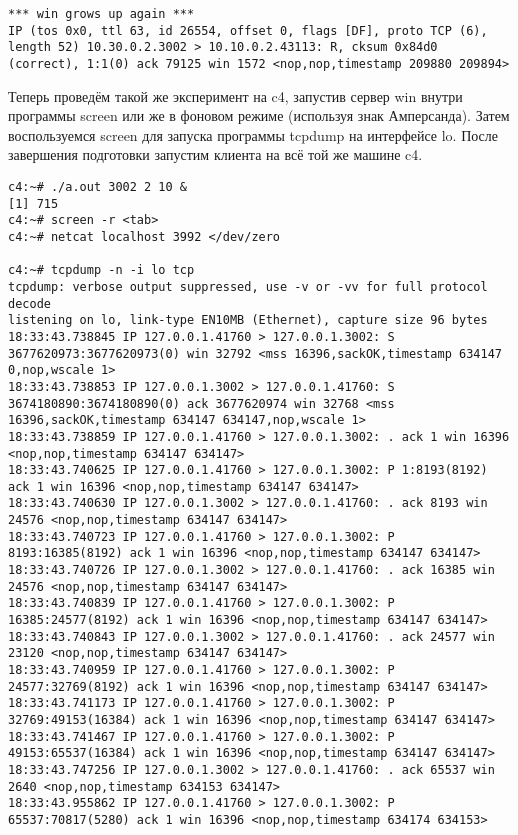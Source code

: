\documentclass[a4paper,12pt]{article}
\begin{document}
\begin{lstlisting}
*** win grows up again ***
IP (tos 0x0, ttl 63, id 26554, offset 0, flags [DF], proto TCP (6), length 52) 10.30.0.2.3002 > 10.10.0.2.43113: R, cksum 0x84d0 (correct), 1:1(0) ack 79125 win 1572 <nop,nop,timestamp 209880 209894>
\end{lstlisting}

Теперь проведём такой же эксперимент на c4, запустив сервер win внутри программы screen или же в фоновом режиме (используя знак Амперсанда). Затем воспользуемся screen для запуска программы tcpdump на интерфейсе lo. После завершения подготовки запустим клиента на всё той же
машине c4. 
\begin{lstlisting}
c4:~# ./a.out 3002 2 10 &
[1] 715
c4:~# screen -r <tab>
c4:~# netcat localhost 3992 </dev/zero

c4:~# tcpdump -n -i lo tcp
tcpdump: verbose output suppressed, use -v or -vv for full protocol decode
listening on lo, link-type EN10MB (Ethernet), capture size 96 bytes
18:33:43.738845 IP 127.0.0.1.41760 > 127.0.0.1.3002: S 3677620973:3677620973(0) win 32792 <mss 16396,sackOK,timestamp 634147 0,nop,wscale 1>
18:33:43.738853 IP 127.0.0.1.3002 > 127.0.0.1.41760: S 3674180890:3674180890(0) ack 3677620974 win 32768 <mss 16396,sackOK,timestamp 634147 634147,nop,wscale 1>
18:33:43.738859 IP 127.0.0.1.41760 > 127.0.0.1.3002: . ack 1 win 16396 <nop,nop,timestamp 634147 634147>
18:33:43.740625 IP 127.0.0.1.41760 > 127.0.0.1.3002: P 1:8193(8192) ack 1 win 16396 <nop,nop,timestamp 634147 634147>
18:33:43.740630 IP 127.0.0.1.3002 > 127.0.0.1.41760: . ack 8193 win 24576 <nop,nop,timestamp 634147 634147>
18:33:43.740723 IP 127.0.0.1.41760 > 127.0.0.1.3002: P 8193:16385(8192) ack 1 win 16396 <nop,nop,timestamp 634147 634147>
18:33:43.740726 IP 127.0.0.1.3002 > 127.0.0.1.41760: . ack 16385 win 24576 <nop,nop,timestamp 634147 634147>
18:33:43.740839 IP 127.0.0.1.41760 > 127.0.0.1.3002: P 16385:24577(8192) ack 1 win 16396 <nop,nop,timestamp 634147 634147>
18:33:43.740843 IP 127.0.0.1.3002 > 127.0.0.1.41760: . ack 24577 win 23120 <nop,nop,timestamp 634147 634147>
18:33:43.740959 IP 127.0.0.1.41760 > 127.0.0.1.3002: P 24577:32769(8192) ack 1 win 16396 <nop,nop,timestamp 634147 634147>
18:33:43.741173 IP 127.0.0.1.41760 > 127.0.0.1.3002: P 32769:49153(16384) ack 1 win 16396 <nop,nop,timestamp 634147 634147>
18:33:43.741467 IP 127.0.0.1.41760 > 127.0.0.1.3002: P 49153:65537(16384) ack 1 win 16396 <nop,nop,timestamp 634147 634147>
18:33:43.747256 IP 127.0.0.1.3002 > 127.0.0.1.41760: . ack 65537 win 2640 <nop,nop,timestamp 634153 634147>
18:33:43.955862 IP 127.0.0.1.41760 > 127.0.0.1.3002: P 65537:70817(5280) ack 1 win 16396 <nop,nop,timestamp 634174 634153>

\end{lstlisting}
\end{document}
